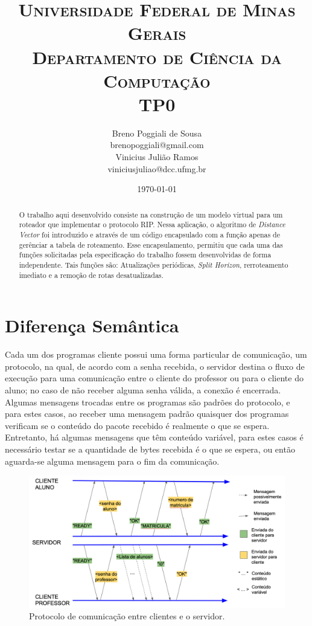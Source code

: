 \documentclass[10pt]{extarticle}
\title{ \textsc{Universidade Federal de Minas Gerais} \\ \textsc{Departamento de Ciência da Computação} \\ \bigskip TP0}
\author{Breno Poggiali de Sousa \\ \normalsize{brenopoggiali@gmail.com}\\
Vinicius Julião Ramos \\ \normalsize{viniciusjuliao@dcc.ufmg.br}}
\date{\today}
\begin{document}
\maketitle

\begin{abstract}
    O trabalho aqui desenvolvido consiste na construção de um modelo virtual
    para um roteador que implementar o protocolo RIP.
    Nessa aplicação, o algoritmo de \textit{Distance Vector} foi introduzido e
    através de um código encapsulado com a função apenas de gerênciar a tabela
    de roteamento.
    Esse encapsulamento, permitiu que cada uma das funções solicitadas pela
    especificação do trabalho fossem desenvolvidas de forma independente.
    Tais funções são: Atualizações periódicas, \textit{Split
    Horizon}, rerroteamento imediato e a remoção de rotas desatualizadas.
\end{abstract}




\section{Diferença Semântica}
Cada um dos programas cliente possui uma forma particular de comunicação, um protocolo, na qual, de acordo com a senha recebida, o servidor destina o fluxo de execução para uma comunicação entre o cliente do professor ou para o cliente do aluno; no caso de não receber alguma senha válida, a conexão é encerrada. Algumas mensagens trocadas entre os programas são padrões do protocolo, e para estes casos, ao receber uma mensagem padrão quaisquer dos programas verificam se o conteúdo do pacote recebido é realmente o que se espera. Entretanto, há algumas mensagens que têm conteúdo variável, para estes casos é necessário testar se a quantidade de bytes recebida é o que se espera, ou então aguarda-se alguma mensagem para o fim da comunicação.
\begin{figure}[h]
	\begin{center}
		\includegraphics[scale=0.35]{Figuras/diagrama.png}
	\end{center}
	\caption{\label{fig:digrama} Protocolo de comunicação entre clientes e o servidor.}
\end{figure}
\end{document}
